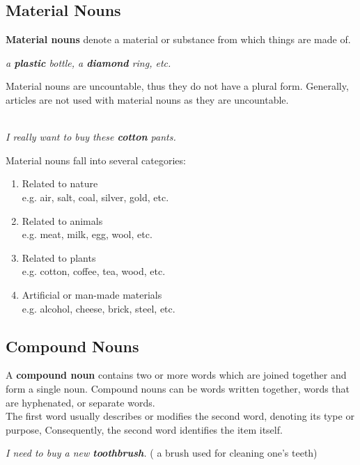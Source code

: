 \documentclass[hidelinks,10pt,a4paper]{article}
\begin{document}
\subsection{Material Nouns}
\textbf{Material nouns} denote a material or substance from which things are made of.
\begin{center}
		\textit{		a \textbf{plastic} bottle, a \textbf{diamond} ring, etc.}
\end{center}
Material nouns are uncountable, thus they do not have a plural form. Generally, articles are not used with material nouns as they are uncountable.
\begin{center}
\textit{
		\\
I really want to buy these \textbf{cotton} pants.}
\end{center}

\newpage
Material nouns fall into several categories:
\begin{center}
		\begin{enumerate}[label=\alph*)]
		\item Related to nature\\
				e.g. air, salt, coal, silver, gold, etc.
		\item Related to animals\\
				e.g. meat, milk, egg, wool, etc.
		\item Related to plants\\
				e.g. cotton, coffee, tea, wood, etc.
		\item Artificial or man-made materials\\
				e.g. alcohol, cheese, brick, steel, etc.
		\end{enumerate}
\end{center}

\subsection{Compound Nouns}
A \textbf{compound noun} contains two or more words which are joined together and form a single noun. Compound nouns can be words written together, words that are hyphenated, or separate words.\\
The first word usually describes or modifies the second word, denoting its type or purpose, Consequently, the second word identifies the item itself.
\begin{center}
\textit{
I need to buy a new \textbf{toothbrush}.} ( a brush used for cleaning one's teeth)
\end{center}
\end{document}
